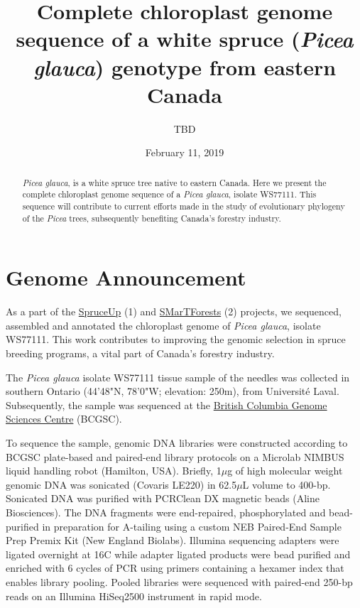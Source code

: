 \documentclass[titlepage,11pt, oneside]{article}   	%
\title{\textbf{Complete chloroplast genome sequence of a white spruce (\textit{Picea glauca}) genotype from eastern Canada}}
\author{TBD}
\date{February 11, 2019}					%
\begin{document}
\maketitle
\begin{abstract}
\textit{Picea glauca}, is a white spruce tree native to eastern Canada. Here we present the complete chloroplast genome sequence of a \textit{Picea glauca}, isolate WS77111. This sequence will contribute to current efforts made in the study of evolutionary phylogeny of the \textit{Picea} trees, subsequently benefiting Canada’s forestry industry.

\end{abstract}

\section*{Genome Announcement}
As a part of the \href{http://spruce-up.ca/en/}{SpruceUp} (1) and \href{https://www.smartforests.ca}{SMarTForests} (2) projects, we sequenced, assembled and annotated the chloroplast genome of \textit{Picea glauca}, isolate WS77111. This work contributes to improving the genomic selection in spruce breeding programs, a vital part of Canada’s forestry industry.
\newline
\par
The \textit{Picea glauca} isolate WS77111 tissue sample of the needles was collected in southern Ontario (44'48"N, 78'0"W; elevation: 250m), from Universit\'{e} Laval. Subsequently, the sample was sequenced at the \href{http://www.bcgsc.ca}{British Columbia Genome Sciences Centre} (BCGSC).
\newline
\par
To sequence the sample, genomic DNA libraries were constructed according to BCGSC plate-based and paired-end library protocols on a Microlab NIMBUS liquid handling robot (Hamilton, USA). Briefly, 1$\mu$g of high molecular weight genomic DNA was sonicated (Covaris LE220) in 62.5$\mu$L volume to 400-bp. Sonicated DNA was purified with PCRClean DX magnetic beads (Aline Biosciences). The DNA fragments were end-repaired, phosphorylated and bead-purified in preparation for A-tailing using a custom NEB Paired-End Sample Prep Premix Kit (New England Biolabs). Illumina sequencing adapters were ligated overnight at 16\degree C while adapter ligated products were bead purified and enriched with 6 cycles of PCR using primers containing a hexamer index that enables library pooling. Pooled libraries were sequenced with paired-end 250-bp reads on an Illumina HiSeq2500 instrument in rapid mode.
\end{document}
